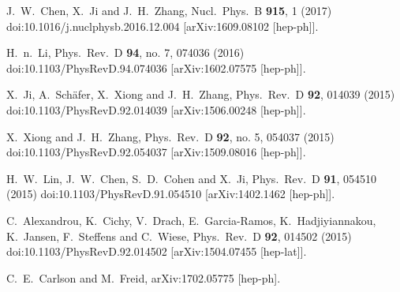 \documentclass[english,preprint,aps,prd,showpacs,superscriptaddress,nofootinbib,tightenlines]{revtex4}
\begin{document}
\begin{thebibliography}{99}
  J.~W.~Chen, X.~Ji and J.~H.~Zhang,
  Nucl.\ Phys.\ B {\bf 915}, 1 (2017)
  doi:10.1016/j.nuclphysb.2016.12.004
  [arXiv:1609.08102 [hep-ph]].


  H.~n.~Li,
  Phys.\ Rev.\ D {\bf 94}, no. 7, 074036 (2016)
  doi:10.1103/PhysRevD.94.074036
  [arXiv:1602.07575 [hep-ph]].


  X.~Ji, A.~Sch\"afer, X.~Xiong and J.~H.~Zhang,
  Phys.\ Rev.\ D {\bf 92}, 014039 (2015)
  doi:10.1103/PhysRevD.92.014039
  [arXiv:1506.00248 [hep-ph]].


  X.~Xiong and J.~H.~Zhang,
  Phys.\ Rev.\ D {\bf 92}, no. 5, 054037 (2015)
  doi:10.1103/PhysRevD.92.054037
  [arXiv:1509.08016 [hep-ph]].


  H.~W.~Lin, J.~W.~Chen, S.~D.~Cohen and X.~Ji,
  Phys.\ Rev.\ D {\bf 91}, 054510 (2015)
  doi:10.1103/PhysRevD.91.054510
  [arXiv:1402.1462 [hep-ph]].


  C.~Alexandrou, K.~Cichy, V.~Drach, E.~Garcia-Ramos, K.~Hadjiyiannakou, K.~Jansen, F.~Steffens and C.~Wiese,
  Phys.\ Rev.\ D {\bf 92}, 014502 (2015)
  doi:10.1103/PhysRevD.92.014502
  [arXiv:1504.07455 [hep-lat]].


  C.~E.~Carlson and M.~Freid,
  arXiv:1702.05775 [hep-ph].



\end{thebibliography}
\end{document}
